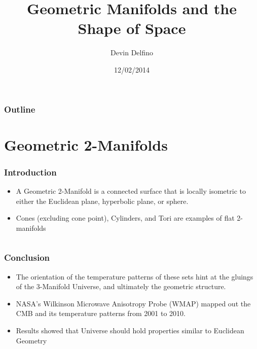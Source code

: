 \documentclass[13pt]{beamer}
\title{Geometric Manifolds and the Shape of Space}
\author{Devin Delfino}
\institute{MATH 331: Geometry}
\date{12/02/2014}
\begin{document}
\frame{\titlepage}

\begin{frame}
\frametitle{Outline}
\tableofcontents
\end{frame}

\section{Geometric 2-Manifolds} %
\begin{frame}
\frametitle{Introduction}
	\begin{itemize}
		\item A \alert{Geometric 2-Manifold} is a connected surface that is locally isometric to either the Euclidean plane, hyperbolic plane, or sphere.
		\item Cones (excluding cone point), Cylinders, and Tori are examples of flat 2-manifolds
	\end{itemize}
	\begin{columns}[r] %
     \centering
  \end{columns}
\end{frame}

\begin{frame}
\frametitle{Conclusion}
  \begin{itemize}
    \item The orientation of the temperature patterns of these sets hint at the gluings of the 3-Manifold Universe, and ultimately the geometric structure.
    \item NASA's Wilkinson Microwave Anisotropy Probe (WMAP) mapped out the CMB and its temperature patterns from 2001 to 2010.
    \item Results showed that Universe should hold properties similar to Euclidean Geometry
  \end{itemize}

  \begin{columns}[c] %
       \centering
    \end{columns}
\end{frame}
\end{document}
